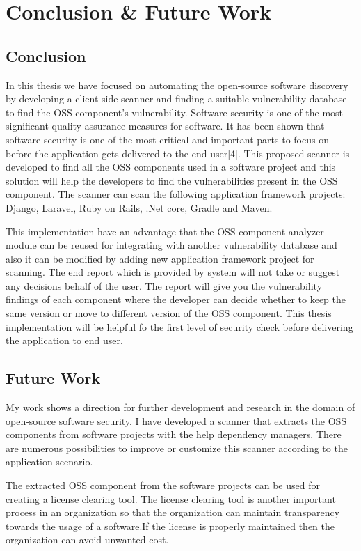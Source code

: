 %
\section{Conclusion \& Future Work}\label{sec:conclusion}

\subsection{Conclusion}
In this thesis we have focused on automating the open-source software discovery by developing a client side scanner and finding a suitable vulnerability database to find the \acs{OSS} component’s vulnerability. Software security is one of the most significant quality assurance measures for software. It has been shown that software security is one of the most critical and important parts to focus on before the application gets delivered to the end user[4]. This proposed scanner is developed to find all the OSS components used in a software project and this solution will help the developers to find the vulnerabilities present in the \acs{OSS} component. The scanner can scan the following application framework projects: Django, Laravel, Ruby on Rails, .Net core, Gradle and Maven.

This implementation have an advantage that the \acs{OSS} component analyzer module can be reused for integrating with another vulnerability database and also it can be modified by adding new application framework project for scanning. The end report which is provided by system will not take or suggest any decisions behalf of the user. The report will give you the vulnerability findings of each component where the developer can decide whether to keep the same version or move to different version of the \acs{OSS} component. This thesis implementation will be helpful fo the first level of security check before delivering the application to end user.

\subsection{Future Work}
My work shows a direction for further development and research in the domain of open-source software security. I have developed a scanner that extracts the \acs{OSS} components from software projects with the help dependency managers. There are numerous
possibilities to improve or customize this scanner according to the application scenario.

The extracted \acs{OSS} component from the software projects can be used for creating a license clearing tool. The license clearing tool is another important process in an organization so that the organization can maintain transparency towards the usage of a software.If the license is properly maintained then the organization can avoid unwanted cost.

